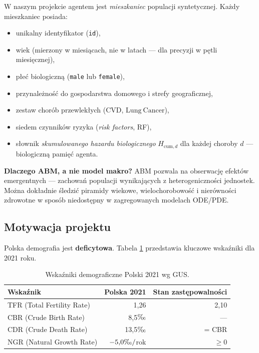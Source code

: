 \documentclass[11pt,a4paper]{article}
\newcommand{\cum}[1][]{H_{\mathrm{cum}#1}}
\newcommand{\promile}{\ensuremath{\text{\textperthousand}}}
\begin{document}
W naszym projekcie agentem jest \emph{mieszkaniec} populacji syntetycznej. Każdy mieszkaniec posiada:
\begin{itemize}[leftmargin=*, itemsep=2pt]
  \item unikalny identyfikator (\texttt{id}),
  \item wiek (mierzony w miesiącach, nie w latach --- dla precyzji w pętli miesięcznej),
  \item płeć biologiczną (\texttt{male} lub \texttt{female}),
  \item przynależność do gospodarstwa domowego i strefy geograficznej,
  \item zestaw chorób przewlekłych ($\mathrm{CVD}$, $\mathrm{Lung\ Cancer}$),
  \item siedem czynników ryzyka (\textit{risk factors}, RF),
  \item słownik \emph{skumulowanego hazardu biologicznego} $\cum[,d]$ dla każdej choroby $d$ --- biologiczną pamięć agenta.
\end{itemize}

\begin{infobox}
\textbf{Dlaczego ABM, a nie model makro?} ABM pozwala na obserwację efektów emergentnych --- zachowań populacji wynikających z heterogeniczności jednostek. Można dokładnie śledzić piramidy wiekowe, wielochorobowość i nierówności zdrowotne w sposób niedostępny w zagregowanych modelach ODE/PDE.
\end{infobox}

\subsection{Motywacja projektu}

Polska demografia jest \textbf{deficytowa}. Tabela \ref{tab:gus2021} przedstawia kluczowe wskaźniki dla 2021 roku.

\begin{table}[h]
\centering
\small
\begin{tabular}{lrr}
\toprule
\textbf{Wskaźnik} & \textbf{Polska 2021} & \textbf{Stan zastępowalności} \\
\midrule
TFR (Total Fertility Rate) & 1{,}26 & 2{,}10 \\
CBR (Crude Birth Rate) & 8{,}5\promile & --- \\
CDR (Crude Death Rate) & 13{,}5\promile & = CBR \\
NGR (Natural Growth Rate) & $-5{,}0\promile/$rok & $\geq 0$ \\
\bottomrule
\end{tabular}
\caption{Wskaźniki demograficzne Polski 2021 wg GUS.}
\label{tab:gus2021}
\end{table}
\end{document}
